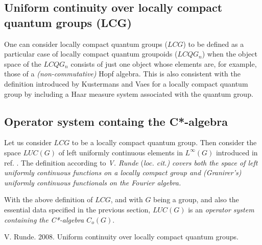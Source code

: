 \documentclass[12pt]{article}
\theoremstyle{plain}
\theoremstyle{definition}
\numberwithin{equation}{section}
\begin{document}
\subsection{Uniform continuity over locally compact quantum groups (LCG) }

 One can consider locally compact quantum groups ($LCG$) to be defined as
a particular case of locally compact quantum groupoids ($LCQG_n$) when the
object space of the $LCQG_n$ consists of just one object whose elements are, for example,
those of a {\em (non-commutative)} Hopf algebra. This is also consistent with the definition introduced by Kustermans and Vaes for a locally compact quantum group by including a Haar measure system associated with the quantum group. 

\subsection{Operator system containg the C*-algebra}

 Let us consider $LCG$ to be a locally compact quantum group. Then consider the space $LUC(G)$ of left uniformly continuous elements in $L^{\infty}(G)$ introduced in ref. \cite{VRunde2k8}. 
The definition according to {\em V. Runde} (\em loc. cit.) covers both the space of left uniformly continuous functions on a locally compact group and (Granirer's) uniformly continuous functionals on the Fourier algebra.

  With the above definition of $LCG$, and with $G$ being a group, and also the essential data specified in the previous section, $LUC(G)$ is an {\em operator system containing the C*-algebra $C_o(G)$}. 

\begin{thebibliography}{9} 
V. Runde. 2008. Uniform continuity over locally compact quantum groups. 

\end{thebibliography} 
\end{document}
